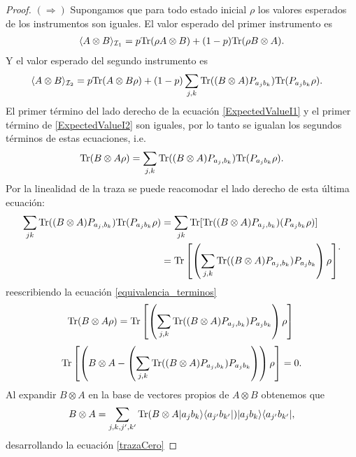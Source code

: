 \documentclass[12pt,oneside]{book}\raggedbottom{}
\begin{document}
\begin{proof}$(\Rightarrow)$ Supongamos que para todo estado inicial $\rho$ los valores esperados de los instrumentos son iguales.  El valor esperado del primer instrumento es \begin{equation}\label{ExpectedValueI1}\begin{split}
	\langle A\otimes B \rangle_{\mathcal{I}_1}& = p{\rm Tr}(\rho A\otimes B)+(1-p){\rm Tr}(\rho B\otimes A).\\
\end{split}\end{equation} Y el valor esperado del segundo instrumento es \begin{equation}\label{ExpectedValueI2}
    \begin{split}
        \langle A\otimes B \rangle_{\mathcal{I}_2}&=p{\rm Tr}(A\otimes B \rho)+(1-p)\sum_{j,k}{\rm Tr}((B\otimes A )P_{a_j b_k} ){\rm Tr}(P_{a_j b_k}\rho).
    \end{split}
\end{equation} El primer término del lado derecho de la ecuación {\ref{ExpectedValueI1}} y el primer término de {\ref{ExpectedValueI2}} son iguales, por lo tanto se igualan los segundos términos de estas ecuaciones, i.e. \begin{equation}\label{equivalencia_terminos}{\rm Tr}(B\otimes A \rho)=\sum_{j,k}{\rm Tr}((B\otimes A) P_{a_j,b_k}){\rm Tr}(P_{a_j b_k}\rho ).\end{equation} Por la linealidad de la traza se puede reacomodar el lado derecho de esta última ecuación: \[\begin{split}\sum_{jk}{\rm Tr}((B\otimes A) P_{a_j,b_k}){\rm Tr}(P_{a_j b_k}\rho )&= \sum_{jk}{\rm Tr}[{\rm Tr}((B\otimes A) P_{a_j,b_k})(P_{a_j b_k}\rho )]\\
	&={\rm Tr}\left[\left(\sum_{j,k}{\rm Tr}((B\otimes A) P_{a_j,b_k})P_{a_j b_k}\right)\rho \right]\end{split}.\]  reescribiendo la ecuación {\ref{equivalencia_terminos}} 
	\[{\rm Tr}(B\otimes A \rho)={\rm Tr}\left[\left(\sum_{j,k}{\rm Tr}((B\otimes A) P_{a_j,b_k})P_{a_j b_k}\right)\rho \right]\\ \]
\begin{equation}\label{trazaCero}\begin{split}
	{\rm Tr}\left[\left(B\otimes A-\left(\sum_{j,k}{\rm Tr}((B\otimes A) P_{a_j,b_k})P_{a_j b_k}\right)\right)\rho \right]=0\\ \end{split}.\end{equation}
	Al expandir $B\otimes A$ en la base de vectores propios de $A\otimes B$ obtenemos que \[B\otimes A=\sum_{j,k,j',k'}{\rm Tr}(B\otimes A |a_j b_k\rangle \langle a_{j'}b_{k'}|)|a_j b_k\rangle \langle a_{j'}b_{k'}|,\] desarrollando la ecuación {\ref{trazaCero}}   

\end{proof}
\end{document}
